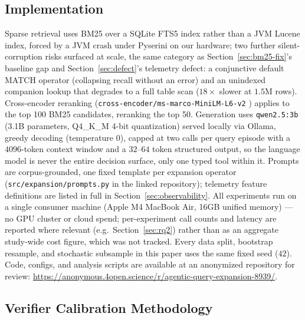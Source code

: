 \documentclass[conference]{IEEEtran}
\begin{document}
\subsection{Implementation}

Sparse retrieval uses BM25 over a SQLite FTS5 index \cite{sqlite-fts5}
rather than a JVM Lucene index, forced by a JVM crash under Pyserini
\cite{pyserini} on our hardware; two further silent-corruption risks
surfaced at scale, the same category as Section~\ref{sec:bm25-fix}'s
baseline gap and Section~\ref{sec:defect}'s telemetry defect: a
conjunctive default MATCH operator (collapsing recall without an
error) and an unindexed companion lookup that degrades to a full table
scan ($18\times$ slower at $1.5$M rows). Cross-encoder
reranking (\texttt{cross-encoder/ms-marco-MiniLM-L6-v2}
\cite{minilm-cross-encoder}) applies to the top 100 BM25 candidates,
reranking the top 50. Generation uses \texttt{qwen2.5:3b} (3.1B
parameters, Q4\_K\_M 4-bit quantization) served locally via Ollama,
greedy decoding (temperature $0$), capped at two calls per query
episode with a $4096$-token context window and a $32$--$64$ token
structured output, so the language model is never the entire decision
surface, only one typed tool within it. Prompts are corpus-grounded,
one fixed template per expansion operator (\texttt{src/expansion/prompts.py}
in the linked repository); telemetry feature definitions are listed in
full in Section~\ref{sec:observability}. All experiments run on a single
consumer machine (Apple M4 MacBook Air, 16GB unified memory) --- no GPU
cluster or cloud spend; per-experiment call counts and latency are
reported where relevant (e.g.\ Section~\ref{sec:rq2}) rather than as an
aggregate study-wide cost figure, which was not tracked. Every
data split, bootstrap resample, and stochastic subsample in this paper
uses the same fixed seed ($42$). Code, configs, and analysis scripts
are available at an anonymized repository for review:
\url{https://anonymous.4open.science/r/agentic-query-expansion-8939/}.

\subsection{Verifier Calibration Methodology}
\label{sec:calib-method}
\end{document}

